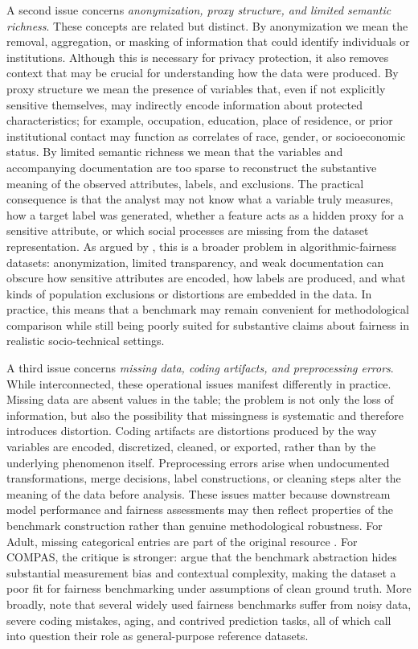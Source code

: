 A second issue concerns \emph{anonymization, proxy structure, and limited semantic richness}. These concepts are related but distinct. By anonymization we mean the removal, aggregation, or masking of information that could identify individuals or institutions. Although this is necessary for privacy protection, it also removes context that may be crucial for understanding how the data were produced. By proxy structure we mean the presence of variables that, even if not explicitly sensitive themselves, may indirectly encode information about protected characteristics; for example, occupation, education, place of residence, or prior institutional contact may function as correlates of race, gender, or socioeconomic status. By limited semantic richness we mean that the variables and accompanying documentation are too sparse to reconstruct the substantive meaning of the observed attributes, labels, and exclusions. The practical consequence is that the analyst may not know what a variable truly measures, how a target label was generated, whether a feature acts as a hidden proxy for a sensitive attribute, or which social processes are missing from the dataset representation. As argued by \textcite{fabris2022story}, this is a broader problem in algorithmic-fairness datasets: anonymization, limited transparency, and weak documentation can obscure how sensitive attributes are encoded, how labels are produced, and what kinds of population exclusions or distortions are embedded in the data. In practice, this means that a benchmark may remain convenient for methodological comparison while still being poorly suited for substantive claims about fairness in realistic socio-technical settings.

A third issue concerns \emph{missing data, coding artifacts, and preprocessing errors}. While interconnected, these operational issues manifest differently in practice. Missing data are absent values in the table; the problem is not only the loss of information, but also the possibility that missingness is systematic and therefore introduces distortion. Coding artifacts are distortions produced by the way variables are encoded, discretized, cleaned, or exported, rather than by the underlying phenomenon itself. Preprocessing errors arise when undocumented transformations, merge decisions, label constructions, or cleaning steps alter the meaning of the data before analysis. These issues matter because downstream model performance and fairness assessments may then reflect properties of the benchmark construction rather than genuine methodological robustness. For Adult, missing categorical entries are part of the original resource \cite{kohavi1996adult}. For COMPAS, the critique is stronger: \textcite{bao2021compaslicated} argue that the benchmark abstraction hides substantial measurement bias and contextual complexity, making the dataset a poor fit for fairness benchmarking under assumptions of clean ground truth. More broadly, \textcite{fabris2022story} note that several widely used fairness benchmarks suffer from noisy data, severe coding mistakes, aging, and contrived prediction tasks, all of which call into question their role as general-purpose reference datasets.

